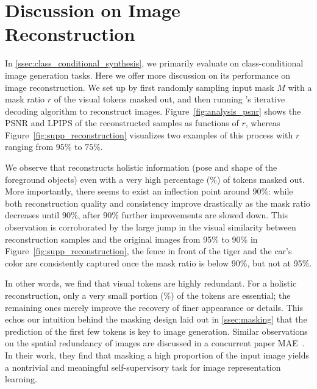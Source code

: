 \newcommand{\suppsection}[1]{\section{{\fontsize{12}{13}\selectfont #1}}}



\suppsection{Discussion on Image Reconstruction}
\label{sec:supp_reconstruction_discussion}

In \ref{ssec:class_conditional_synthesis}, we primarily evaluate \model on class-conditional image generation tasks. Here we offer more discussion on its performance on image reconstruction. We set up by first randomly sampling input mask $M$ with a mask ratio $r$ of the visual tokens masked out, and then running \model's iterative decoding algorithm to reconstruct images. Figure~\ref{fig:analysis_psnr} shows the PSNR and LPIPS\cite{zhang2018lpips} of the reconstructed samples as functions of $r$, whereas Figure~\ref{fig:supp_reconstruction} visualizes two examples of this process with $r$ ranging from $95\%$ to $75\%$. 


We observe that \model reconstructs holistic information (\eg pose and shape of the foreground objects) even with a very high percentage (\%) of tokens masked out. More importantly, there seems to exist an inflection point around 90\%: while both reconstruction quality and consistency improve drastically as the mask ratio decreases until 90\%, after 90\% further improvements are slowed down. This observation is corroborated by the large jump in the visual similarity between reconstruction samples and the original images from 95\% to 90\% in Figure~\ref{fig:supp_reconstruction}, \eg the fence in front of the tiger and the car's color are consistently captured once the mask ratio is below 90\%, but not at 95\%.

In other words, we find that visual tokens are highly redundant. For a holistic reconstruction, only a very small portion (\%) of the tokens are essential; the remaining ones merely improve the recovery of finer appearance or details. This echos our intuition behind the masking design laid out in \ref{ssec:masking} that the prediction of the first few tokens is key to image generation. Similar observations on the spatial redundancy of images are discussed in a concurrent paper MAE~\cite{he2021mae}. In their work, they find that masking a high proportion of the input image yields a nontrivial and meaningful self-supervisory task for image representation learning.

